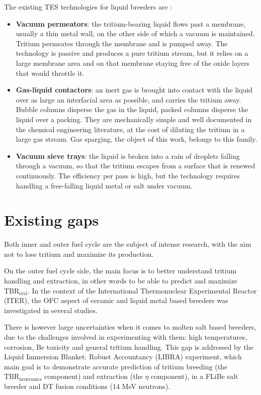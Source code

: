 \documentclass[a4paper,11pt,oneside]{report}
\begin{document}
The existing TES technologies for liquid breeders are \cite{ricapito_tritium_2011}:
\begin{itemize}
    \item \textbf{Vacuum permeators}: the tritium-bearing liquid flows past a membrane, usually a thin metal wall, on the other side of which a vacuum is maintained. Tritium permeates through the membrane and is pumped away. The technology is passive and produces a pure tritium stream, but it relies on a large membrane area and on that membrane staying free of the oxide layers that would throttle it.
    \item \textbf{Gas-liquid contactors}: an inert gas is brought into contact with the liquid over as large an interfacial area as possible, and carries the tritium away. Bubble columns disperse the gas in the liquid, packed columns disperse the liquid over a packing. They are mechanically simple and well documented in the chemical engineering literature, at the cost of diluting the tritium in a large gas stream. Gas sparging, the object of this work, belongs to this family.
    \item \textbf{Vacuum sieve trays}: the liquid is broken into a rain of droplets falling through a vacuum, so that the tritium escapes from a surface that is renewed continuously. The efficiency per pass is high, but the technology requires handling a free-falling liquid metal or salt under vacuum.
\end{itemize}

\section{Existing gaps}

Both inner and outer fuel cycle are the subject of intense research, with the aim not to lose tritium and maximize its production. 

On the outer fuel cycle side, the main focus is to better understand tritium handling and extraction, in other words to be able to predict and maximize $\mathrm{TBR_{real}}$. In the context of the International Thermonuclear Experimental Reactor (ITER), the OFC aspect of ceramic and liquid metal based breeders was investigated in several studies\cite{ricapito_tritium_2011,utili_tritium_2019,abdou_physics_2020}.

There is however large uncertainties when it comes to molten salt based breeders, due to the challenges involved in experimenting with them: high temperatures, corrosion, Be toxicity and general tritium handling. This gap is addressed by the Liquid Immersion Blanket: Robust Accountancy (LIBRA) experiment, which main goal is to demonstrate accurate prediction of tritium breeding (the $\mathrm{TBR_{neutronics}}$ component) and extraction (the $\eta$ component), in a FLiBe salt breeder and DT fusion conditions (14 MeV neutrons)\cite{ferry_libra_2023}. 
\end{document}
